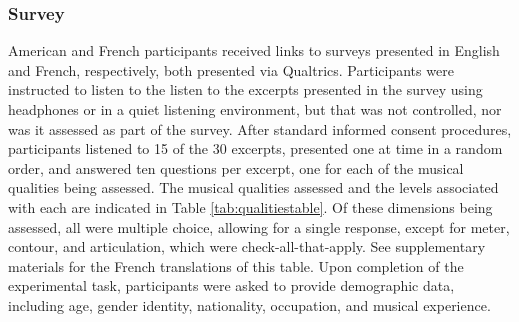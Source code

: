 \documentclass[
  english,
  man,floatsintext]{apa6}
\begin{document}
\hypertarget{survey}{%
\subsubsection{Survey}\label{survey}}

American and French participants received links to surveys presented in English and French, respectively, both presented via Qualtrics. Participants were instructed to listen to the listen to the excerpts presented in the survey using headphones or in a quiet listening environment, but that was not controlled, nor was it assessed as part of the survey. After standard informed consent procedures, participants listened to 15 of the 30 excerpts, presented one at time in a random order, and answered ten questions per excerpt, one for each of the musical qualities being assessed. The musical qualities assessed and the levels associated with each are indicated in Table \ref{tab:qualitiestable}. Of these dimensions being assessed, all were multiple choice, allowing for a single response, except for meter, contour, and articulation, which were check-all-that-apply. See supplementary materials for the French translations of this table. Upon completion of the experimental task, participants were asked to provide demographic data, including age, gender identity, nationality, occupation, and musical experience.
\end{document}
